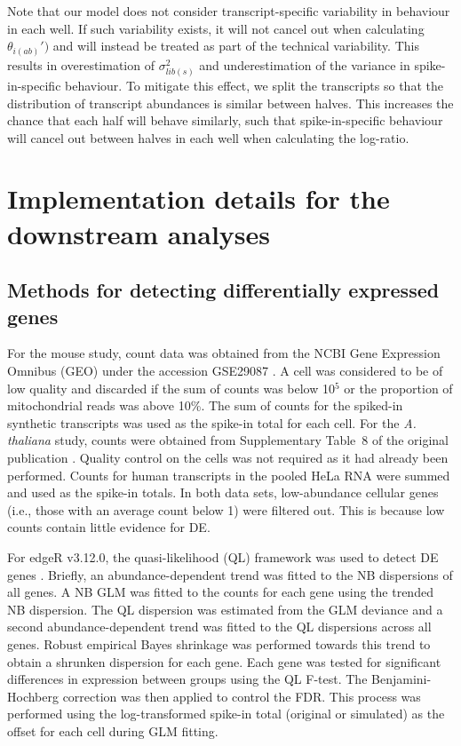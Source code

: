 \documentclass{article}
\begin{document}
Note that our model does not consider transcript-specific variability in behaviour in each well.
If such variability exists, it will not cancel out when calculating $\theta_{i(ab)}')$ and will instead be treated as part of the technical variability.
This results in overestimation of $\sigma^2_{lib(s)}$ and underestimation of the variance in spike-in-specific behaviour.
To mitigate this effect, we split the transcripts so that the distribution of transcript abundances is similar between halves.
This increases the chance that each half will behave similarly, such that spike-in-specific behaviour will cancel out between halves in each well when calculating the log-ratio.

\section{Implementation details for the downstream analyses}

\subsection{Methods for detecting differentially expressed genes}
For the mouse study, count data was obtained from the NCBI Gene Expression Omnibus (GEO) under the accession GSE29087 \cite{islam2011characterization}.
A cell was considered to be of low quality and discarded if the sum of counts was below 10$^5$ or the proportion of mitochondrial reads was above 10\%.
The sum of counts for the spiked-in synthetic transcripts was used as the spike-in total for each cell.
For the \textit{A. thaliana} study, counts were obtained from Supplementary Table~8 of the original publication \cite{brennecke2013accounting}.
Quality control on the cells was not required as it had already been performed.
Counts for human transcripts in the pooled HeLa RNA were summed and used as the spike-in totals.
In both data sets, low-abundance cellular genes (i.e., those with an average count below 1) were filtered out.
This is because low counts contain little evidence for DE. 

For edgeR v3.12.0, the quasi-likelihood (QL) framework was used to detect DE genes \cite{lund2012detecting}.
Briefly, an abundance-dependent trend was fitted to the NB dispersions of all genes.
A NB GLM was fitted to the counts for each gene using the trended NB dispersion.
The QL dispersion was estimated from the GLM deviance and a second abundance-dependent trend was fitted to the QL dispersions across all genes.
Robust empirical Bayes shrinkage was performed towards this trend to obtain a shrunken dispersion for each gene.
Each gene was tested for significant differences in expression between groups using the QL F-test.
The Benjamini-Hochberg correction was then applied to control the FDR.
This process was performed using the log-transformed spike-in total (original or simulated) as the offset for each cell during GLM fitting.
\end{document}
